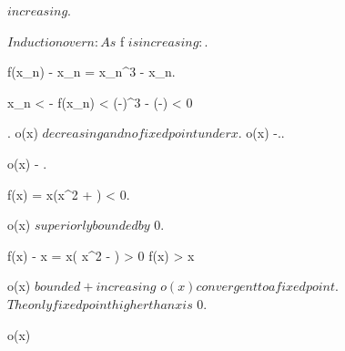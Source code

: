 \documentclass[../Main/main]{subfiles}
\begin{document}
{{{{{			 $ increasing $.

			$Induction over n: As $ f $ is increasing: $.

			f(x_n) - x_n = x_n^3 - x_n.

			x_n < - \imp f(x_n) < (-)^3 - (-) < 0
			
			}.
			o(x) $ decreasing and no fixed point under x $.
			o(x) \convergesto -\infty..




			{
				o(x) \convergesto - .

				f(x) = x(x^2 + ) < 0.

				o(x) $ superiorly bounded by $ 0.

				f(x) - x = x( x^2 -  ) > 0 \imp f(x) > x

				o(x) $ bounded + increasing $ \imp $ o(x) convergent to a fixed point$.
				$ The only fixed point higher than x is $ 0.

				o(x) 
			}
		}
	}
}
}
\end{document}
